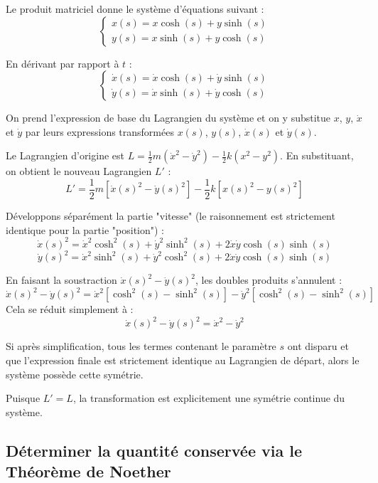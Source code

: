 \documentclass[french]{yLectureNote}
\begin{document}
Le produit matriciel donne le système d'équations suivant :
$$ \begin{cases} 
x(s) = x \cosh(s) + y \sinh(s) \\ 
y(s) = x \sinh(s) + y \cosh(s) 
\end{cases} $$


En dérivant par rapport à $t$ :
$$ \begin{cases} 
\dot{x}(s) = \dot{x} \cosh(s) + \dot{y} \sinh(s) \\ 
\dot{y}(s) = \dot{x} \sinh(s) + \dot{y} \cosh(s) 
\end{cases} $$


On prend l'expression de base du Lagrangien du système et on y substitue $x$, $y$, $\dot{x}$ et $\dot{y}$ par leurs expressions transformées $x(s)$, $y(s)$, $\dot{x}(s)$ et $\dot{y}(s)$.


Le Lagrangien d'origine est $L = \frac{1}{2}m(\dot{x}^2 - \dot{y}^2) - \frac{1}{2}k(x^2 - y^2)$. En substituant, on obtient le nouveau Lagrangien $L'$ :
$$ L' = \frac{1}{2}m \left[ \dot{x}(s)^2 - \dot{y}(s)^2 \right] - \frac{1}{2}k \left[ x(s)^2 - y(s)^2 \right] $$



Développons séparément la partie "vitesse" (le raisonnement est strictement identique pour la partie "position") :
$$ \dot{x}(s)^2 = \dot{x}^2\cosh^2(s) + \dot{y}^2\sinh^2(s) + 2\dot{x}\dot{y}\cosh(s)\sinh(s) $$
$$ \dot{y}(s)^2 = \dot{x}^2\sinh^2(s) + \dot{y}^2\cosh^2(s) + 2\dot{x}\dot{y}\cosh(s)\sinh(s) $$

En faisant la soustraction $\dot{x}(s)^2 - \dot{y}(s)^2$, les doubles produits s'annulent :
$$ \dot{x}(s)^2 - \dot{y}(s)^2 = \dot{x}^2 \left[\cosh^2(s) - \sinh^2(s)\right] - \dot{y}^2 \left[\cosh^2(s) - \sinh^2(s)\right] $$
Cela se réduit simplement à :
$$ \dot{x}(s)^2 - \dot{y}(s)^2 = \dot{x}^2 - \dot{y}^2 $$


Si après simplification, tous les termes contenant le paramètre $s$ ont disparu et que l'expression finale est strictement identique au Lagrangien de départ, alors le système possède cette symétrie.


Puisque $L' = L$, la transformation est explicitement une symétrie continue du système.




\subsection{Déterminer la quantité conservée via le Théorème de Noether}
\end{document}
